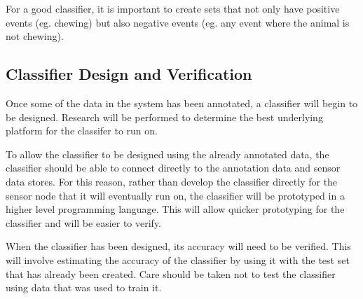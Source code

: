 For a good classifier, it is important to create sets that not only have positive events (eg. chewing) but also negative events (eg. any event where the animal is not chewing).

\subsection*{Classifier Design and Verification} 

Once some of the data in the system has been annotated, a classifier will begin to be designed. Research will be performed to determine the best underlying platform for the classifer to run on. 

To allow the classifier to be designed using the already annotated data, the classifier should be able to connect directly to the annotation data and sensor data stores. For this reason, rather than develop the classifier directly for the sensor node that it will eventually run on, the classifier will be prototyped in a higher level programming language. This will allow quicker prototyping for the classifier and will be easier to verify.

When the classifier has been designed, its accuracy will need to be verified. This will involve estimating the accuracy of the classifier by using it with the test set that has already been created. Care should be taken not to test the classifier using data that was used to train it. 